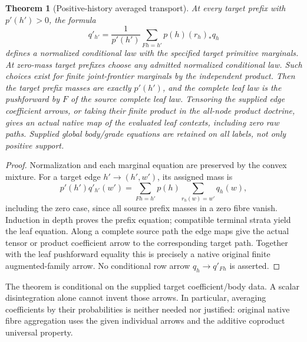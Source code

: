 \documentclass[11pt]{article}
\newtheorem{theorem}{Theorem}\newtheorem{proposition}[theorem]{Proposition}
\begin{document}
\begin{theorem}[Positive-history averaged transport]
At every target prefix with $p'(h')>0$, the formula
\[
 q'_{h'}=\frac{1}{p'(h')}\sum_{Fh=h'}p(h)(r_h)_*q_h \tag{1}
\]
defines a normalized conditional law with the specified target primitive marginals. At zero-mass target prefixes choose any admitted normalized conditional law. Such choices exist for finite joint-frontier marginals by the independent product. Then the target prefix masses are exactly $p'(h')$, and the complete leaf law is the pushforward by $F$ of the source complete leaf law. Tensoring the supplied edge coefficient arrows, or taking their finite product in the all-node product doctrine, gives an actual native map of the evaluated leaf contexts, including zero raw paths. Supplied global body/grade equations are retained on all labels, not only positive support.
\end{theorem}
\begin{proof}
Normalization and each marginal equation are preserved by the convex mixture. For a target edge $h'\to(h',w')$, its assigned mass is
\[
 p'(h')q'_{h'}(w')=\sum_{Fh=h'}p(h)\sum_{r_h(w)=w'}q_h(w),
\]
including the zero case, since all source prefix masses in a zero fibre vanish. Induction in depth proves the prefix equation; compatible terminal strata yield the leaf equation. Along a complete source path the edge maps give the actual tensor or product coefficient arrow to the corresponding target path. Together with the leaf pushforward equality this is precisely a native original finite augmented-family arrow. No conditional row arrow $q_h\to q'_{Fh}$ is asserted.\end{proof}

The theorem is conditional on the supplied target coefficient/body data. A scalar disintegration alone cannot invent those arrows. In particular, averaging coefficients by their probabilities is neither needed nor justified: original native fibre aggregation uses the given individual arrows and the additive coproduct universal property.
\end{document}
